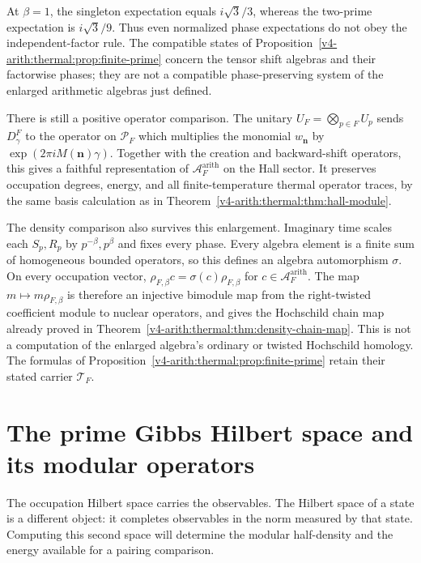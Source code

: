At $\beta=1$, the singleton expectation equals $i\sqrt3/3$,
whereas the two-prime expectation is $i\sqrt3/9$. Thus even
normalized phase expectations do not obey the independent-factor
rule. The compatible states of Proposition~\ref{v4-arith:thermal:prop:finite-prime}
concern the tensor shift algebras and their factorwise phases;
they are not a compatible phase-preserving system of the enlarged
arithmetic algebras just defined.

There is still a positive operator comparison. The unitary
$U_F=\bigotimes_{p\in F}U_p$ sends $D^F_\gamma$ to the operator
on $\mathcal P_F$ which multiplies the monomial $w_{\mathbf n}$ by
$\exp(2\pi i M(\mathbf n)\gamma)$. Together with the creation
and backward-shift operators, this gives a faithful representation
of $\mathcal A_F^{\mathrm{arith}}$ on the Hall sector. It preserves
occupation degrees, energy, and all finite-temperature thermal
operator traces, by the same basis calculation as in
Theorem~\ref{v4-arith:thermal:thm:hall-module}.

The density comparison also survives this enlargement. Imaginary
time scales each $S_p,R_p$ by $p^{-\beta},p^{\beta}$ and fixes
every phase. Every algebra element is a finite sum of homogeneous
bounded operators, so this defines an algebra automorphism $\sigma$.
On every occupation vector,
$\rho_{F,\beta}c=\sigma(c)\rho_{F,\beta}$ for
$c\in\mathcal A_F^{\mathrm{arith}}$. The map
$m\mapsto m\rho_{F,\beta}$ is therefore an injective bimodule map
from the right-twisted coefficient module to nuclear operators,
and gives the Hochschild chain map already proved in
Theorem~\ref{v4-arith:thermal:thm:density-chain-map}. This is not a computation of
the enlarged algebra's ordinary or twisted Hochschild homology.
The formulas of Proposition~\ref{v4-arith:thermal:prop:finite-prime} retain their
stated carrier $\mathcal T_F$.

\section{The prime Gibbs Hilbert space and its modular operators}
\label{v4-arith:thermal:gns-section}

The occupation Hilbert space carries the observables. The Hilbert
space of a state is a different object: it completes observables
in the norm measured by that state. Computing this second space
will determine the modular half-density and the energy available
for a pairing comparison.

